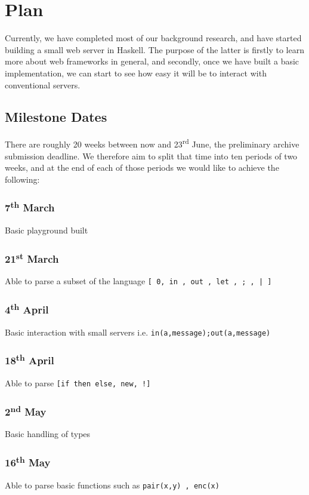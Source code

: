 \section{Plan}

Currently, we have completed most of our background research, and have started building a small web server in Haskell. The purpose of the latter is firstly to learn more about web frameworks in general, and secondly, once we have built a basic implementation, we can start to see how easy it will be to interact with conventional servers.

\subsection{Milestone Dates}

There are roughly 20 weeks between now and 23\textsuperscript{rd} June, the preliminary archive submission deadline. We therefore aim to split that time into ten periods of two weeks, and at the end of each of those periods we would like to achieve the following:
\subsubsection{7\textsuperscript{th} March} 
Basic playground built    
\subsubsection{21\textsuperscript{st} March}
Able to parse a subset of the language \verb![ 0, in , out , let , ; , | ]! 
\subsubsection{4\textsuperscript{th} April}  
Basic interaction with small servers i.e. \verb!in(a,message);out(a,message)!   
\subsubsection{18\textsuperscript{th} April}
Able to parse \verb?[if then else, new, !]?    
\subsubsection{2\textsuperscript{nd} May}    
Basic handling of types  
\subsubsection{16\textsuperscript{th} May}   
Able to parse basic functions such as \verb!pair(x,y) , enc(x)!  
